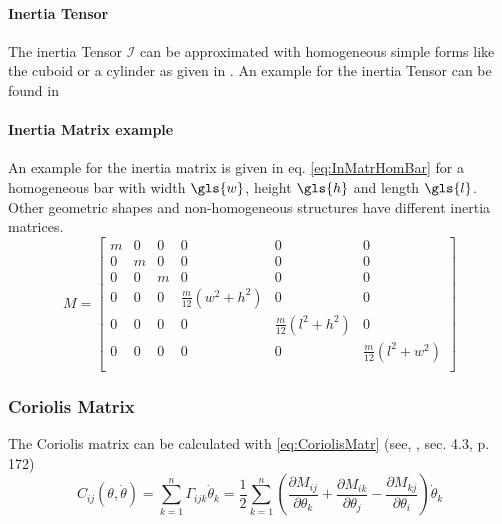 \paragraph{Inertia Tensor}
The inertia Tensor
 $\mathcal{I}$ 
can be approximated with homogeneous simple forms like the cuboid or a cylinder as given in \cite{PhysScientEng}. 
An example for the inertia Tensor can be found in \cite{MathIntroRobManip} 

\paragraph{Inertia Matrix example}
An example for the inertia matrix is given in eq. \ref{eq:InMatrHomBar} for a homogeneous bar with width $\gls{w}$, height $\gls{h}$ and length $\gls{l}$. Other geometric shapes and non-homogeneous structures have different inertia matrices. 
\begin{equation} \label{eq:InMatrHomBar}
	M=
	\begin{bmatrix}
	m & 0 & 0 & 0 & 0 & 0\\
	0 & m & 0 & 0 & 0 & 0\\
	0 & 0 & m & 0 & 0 & 0\\
	0 & 0 & 0 & \frac{m}{12}(w^2 + h^2) & 0 & 0\\
	0 & 0 & 0 & 0 & \frac{m}{12}(l^2+h^2) & 0\\
	0 & 0 & 0 & 0 & 0 & \frac{m}{12}(l^2 +w^2)\\
	\end{bmatrix}
\end{equation}


%
%	


\subsubsection{Coriolis Matrix }
The Coriolis matrix can be calculated with \cref{eq:CoriolisMatr} (see, \cite{MathIntroRobManip}, sec. 4.3, p. 172)
\begin{equation}\label{eq:CoriolisMatr}
	C_{ij}(\theta,\dot{\theta}) = \sum_{k=1}^{n} \Gamma_{ijk}\dot{\theta}_k=\frac{1}{2} \sum_{k=1}^{n} (\frac{\partial M_{ij}}{\partial\theta_k}+\frac{\partial M_{ik}}{\partial\theta_j}-\frac{\partial M_{kj}}{\partial\theta_i})\dot{\theta}_k
\end{equation}

